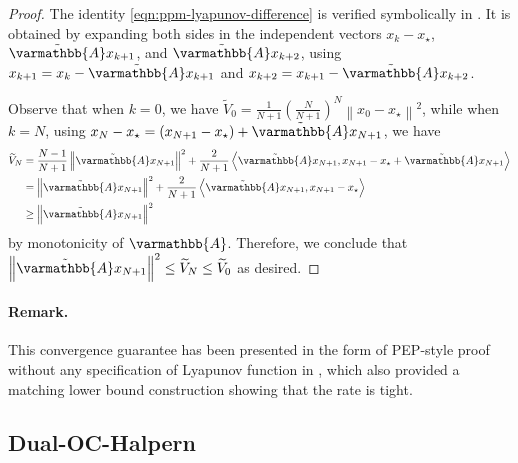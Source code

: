 \documentclass{article}
\theoremstyle{definition}
\theoremstyle{plain}
\newcommand{\opA}{{\varmathbb{A}}}
\newcommand{\inprod}[2]{\left\langle #1,#2 \right\rangle}
\newcommand{\sqnorm}[1]{\left\| #1 \right\|^2}
\newcommand{\topa}{\tilde{\opA}}
\newcommand{\dualoc}{Dual-OC-Halpern}
\begin{document}
\begin{proof}
The identity \eqref{eqn:ppm-lyapunov-difference} is verified symbolically in
.
It is obtained by expanding both sides in the independent vectors
$x_k-x_\star$, $\topa x_{k+1}$, and $\topa x_{k+2}$, using
$x_{k+1}=x_k-\topa x_{k+1}$ and $x_{k+2}=x_{k+1}-\topa x_{k+2}$.

Observe that when $k=0$, we have $\widetilde{V}_0 = \frac{1}{N+1} \left( \frac{N}{N+1} \right)^N \sqnorm{x_0-x_\star}$, 
while when $k=N$, using $x_N - x_\star = (x_{N+1} - x_\star) + \topa x_{N+1}$, we have
\begin{align*}
    \widetilde{V}_N & = \frac{N-1}{N+1} \sqnorm{\topa x_{N+1}} + \frac{2}{N+1} \inprod{\topa x_{N+1}}{x_{N+1} - x_\star + \topa x_{N+1}} \\
    & = \sqnorm{\topa x_{N+1}} + \frac{2}{N+1}\inprod{\topa x_{N+1}}{x_{N+1}-x_\star} \\
    & \ge \sqnorm{\topa x_{N+1}}
\end{align*}
by monotonicity of $\opA$.
Therefore, we conclude that $\sqnorm{\topa x_{N+1}} \le \widetilde{V}_N \le \widetilde{V}_0$ as desired.
\end{proof}

\paragraph{Remark.}
This convergence guarantee has been presented in the form of PEP-style proof without any specification of Lyapunov function in \cite{guTightSublinearConvergence2020}, which also provided a matching lower bound construction showing that the rate is tight.

\subsection{\dualoc}
\label{section:dual-oc-halpern}
\end{document}
